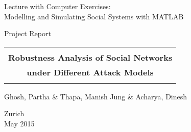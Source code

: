 
\thispagestyle{empty}


\begin{center}

\bigskip


\bigskip


\bigskip


\LARGE{ 	Lecture with Computer Exercises:\\ }
\LARGE{ Modelling and Simulating Social Systems with MATLAB\\}

\bigskip

\bigskip

\small{Project Report}\\

\bigskip

\bigskip

\bigskip

\bigskip


\begin{tabular}{|c|}
\hline
\\
\textbf{\LARGE{Robustness Analysis of Social Networks}}\\
\textbf{\LARGE{under Different Attack Models}}\\
\\
\hline
\end{tabular}
\bigskip

\bigskip

\bigskip

\LARGE{Ghosh, Partha \& Thapa, Manish Jung \& Acharya, Dinesh}



\bigskip

\bigskip

\bigskip

\bigskip

\bigskip

\bigskip

\bigskip

\bigskip

Zurich\\
May 2015\\

\end{center}


